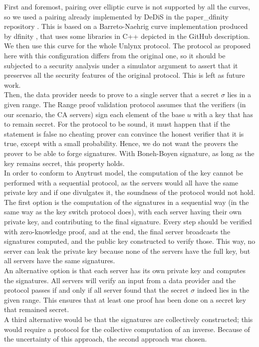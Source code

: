 \documentclass{article}
\begin{document}
First and foremost, pairing over elliptic curve is not supported by all the curves, so we used a pairing already implemented by DeDiS in the paper\_dfinity repository \cite{dfinitydedis}.  This is based on a Barreto-Naehrig curve implementation produced by dfinity \cite{dfinity}, that uses some libraries in C++ depicted in the GitHub description. We then use this curve for the whole Unlynx protocol. The protocol as proposed here with this configuration differs from the original one, so it should be subjected to a security analysis under a simulator argument to assert that it preserves all the security features of the original protocol. This is left as future work.\\

Then, the data provider needs to prove to a single server that a secret $\sigma$ lies in a given range. 
The Range proof validation protocol assumes that the verifiers (in our scenario, the CA servers) sign each element of the base $u$ with a key that has to remain secret.
For the protocol to be sound, it must happen that if the statement is false no cheating prover can convince the honest verifier that it is true, except with a small probability. Hence, we do not want the provers the prover to be able to forge signatures.
With Boneh-Boyen signature, as long as the key remains secret, this property holds.\\
In order to conform to Anytrust model, the computation of the key cannot be performed with a sequential protocol, as the servers would all have the same private key and if one divulgates it, the soundness of the protocol would not hold. \\
The first option is the computation of the signatures in a sequential way (in the same way as the key switch protocol does), with each server having their own private key, and contributing to the final signature. Every step should be verified with zero-knowledge proof, and at the end, the final server broadcasts the signatures computed, and the public key constructed to verify those. This way, no server can leak the private key because none of the servers have the full key, but all servers have the same signatures. \\
An alternative option is that each server has its own private key and computes the signatures. All servers will verify an input from a data provider and the protocol passes if and only if all server found that the secret $\sigma$ indeed lies in the given range. This ensures that at least one proof has been done on a secret key that remained secret.\\
A third alternative would be that the signatures are collectively constructed; this would require a protocol for the collective computation of an inverse. Because of the uncertainty of this approach, the second approach was chosen.
\end{document}
